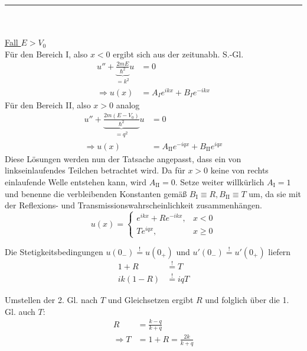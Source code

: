\documentclass{article}
\begin{document}
{\color{violet}
\hrule
	\\
	\\
	\underline{Fall $E>V_0$}\\
	Für den Bereich I, also $x<0$ ergibt sich aus der zeitunabh. S.-Gl.
		\begin{align*}
			u'' + \underbrace{\frac{2mE}{\hbar^2}}_{=k^2}u &= 0 \\
			\Rightarrow u(x) &= A_I e^{ikx} + B_I e^{-ikx}
		\end{align*}
	Für den Bereich II, also $x>0$ analog
		\begin{align*}
			u'' + \underbrace{\frac{2m(E - V_0)}{\hbar^2}}_{=q^2}u &= 0 \\
			\Rightarrow u(x) &= A_\text{II} e^{-iqx} + B_\text{II} e^{iqx}
		\end{align*}
	Diese Lösungen werden nun der Tatsache angepasst, dass ein von linkseinlaufendes Teilchen betrachtet wird. Da für $x>0$ keine von rechts einlaufende Welle entstehen kann, wird $A_\text{II} = 0$. Setze weiter willkürlich $A_\text{I} = 1$ und benenne die verbleibenden Konstanten gemäß $B_\text{I}\equiv R, B_\text{II}\equiv T$ um, da sie mit der Reflexions- und Transmissionswahrscheinlichkeit zusammenhängen.
		$$u(x) =
		\begin{cases}
			e^{ikx} + Re^{-ikx}, & x<0 \\
			Te^{iqx}, & x\geq 0
		\end{cases}$$
	
	Die Stetigkeitsbedingungen $u(0_-)\stackrel{!}{=} u(0_+)$ und $u'(0_-)\stackrel{!}{=} u'(0_+)$ liefern
		\begin{align*}
			1 + R &\stackrel{!}{=} T \\
			ik(1 - R) &\stackrel{!}{=} iqT
		\end{align*}

	Umstellen der 2. Gl. nach $T$ und Gleichsetzen ergibt $R$ und folglich über die 1. Gl. auch $T$:
		\begin{align*}
			R &= \frac{k - q}{k + q} \\
			\Rightarrow T &= 1 + R = \frac{2k}{k + q}
		\end{align*}
	


}
\end{document}
